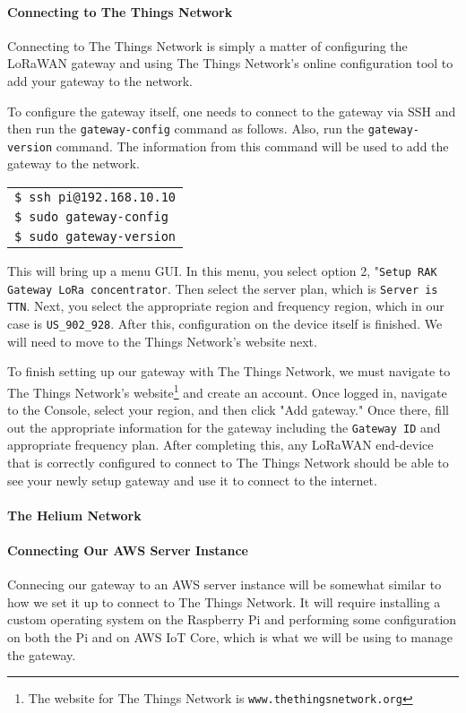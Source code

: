 \paragraph{Connecting to The Things Network}
Connecting to The Things Network is simply a matter of configuring the LoRaWAN gateway and using The Things Network's online configuration tool to add your gateway to the network.

To configure the gateway itself, one needs to connect to the gateway via SSH and then run the \texttt{gateway-config} command as follows. Also, run the \texttt{gateway-version} command. The information from this command will be used to add the gateway to the network.

\begin{tabular}{l}
     \texttt{\$ ssh pi@192.168.10.10} \\
     \texttt{\$ sudo gateway-config} \\
     \texttt{\$ sudo gateway-version} \\ 
\end{tabular}

This will bring up a menu GUI. In this menu, you select option 2, "\texttt{Setup RAK Gateway LoRa concentrator}. Then select the server plan, which is \texttt{Server is TTN}. Next, you select the appropriate region and frequency region, which in our case is \texttt{US\_902\_928}. After this, configuration on the device itself is finished. We will need to move to the Things Network's website next.

To finish setting up our gateway with The Things Network, we must navigate to The Things Network's website\footnote{The website for The Things Network is \texttt{www.thethingsnetwork.org}} and create an account. Once logged in, navigate to the Console, select your region, and then click "Add gateway." Once there, fill out the appropriate information for the gateway including the \texttt{Gateway ID} and appropriate frequency plan. After completing this, any LoRaWAN end-device that is correctly configured to connect to The Things Network should be able to see your newly setup gateway and use it to connect to the internet.

\paragraph{The Helium Network}

\paragraph{Connecting Our AWS Server Instance}
Connecing our gateway to an AWS server instance will be somewhat similar to how we set it up to connect to The Things Network. It will require installing a custom operating system on the Raspberry Pi and performing some configuration on both the Pi and on AWS IoT Core, which is what we will be using to manage the gateway.

